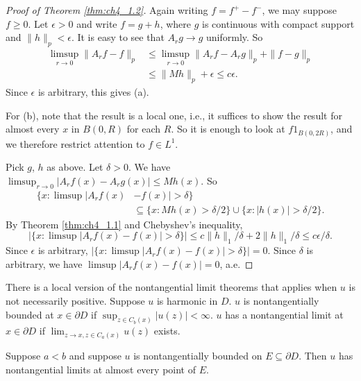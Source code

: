 \begin{proof}[Proof of Theorem \ref{thm:ch4_1.2}]
Again writing $f = f^+ - f^-$, we may suppose $f \geq 0$. Let $\epsilon > 0$ and write $f = g + h$, where $g$ is continuous with compact support and $\|h\|_p < \epsilon$. It is easy to see that $A_r g \to g$ uniformly. So
\begin{align*}
    \limsup_{r\to 0} \|A_r f - f\|_p &\leq \limsup_{r\to 0} \|A_r f - A_r g\|_p + \|f - g\|_p \\
    &\leq \|Mh\|_p + \epsilon \leq c\epsilon.
\end{align*}
Since $\epsilon$ is arbitrary, this gives (a).

For (b), note that the result is a local one, i.e., it suffices to show the result for almost every $x$ in $B(0,R)$ for each $R$. So it is enough to look at $f1_{B(0,2R)}$, and we therefore restrict attention to $f \in L^1$.

Pick $g$, $h$ as above. Let $\delta > 0$. We have $\limsup_{r\to 0} |A_r f(x) - A_r g(x)| \leq Mh(x)$. So
\begin{align*}
    \{x : \limsup |A_r f(x) &- f(x)| > \delta\} \\
    &\subseteq \{x : Mh(x) > \delta/2\} \cup \{x : |h(x)| > \delta/2\}.
\end{align*}
By Theorem \ref{thm:ch4_1.1} and Chebyshev's inequality,
\[
    |\{x : \limsup |A_r f(x) - f(x)| > \delta\}| \leq c\|h\|_1/\delta + 2\|h\|_1/\delta \leq c\epsilon/\delta.
\]
Since $\epsilon$ is arbitrary, $|\{x : \limsup |A_r f(x) - f(x)| > \delta\}| = 0$. Since $\delta$ is arbitrary, we have $\limsup |A_r f(x) - f(x)| = 0$, a.e.
\end{proof}


There is a local version of the nontangential limit theorems that applies when $u$ is not necessarily positive. Suppose $u$ is harmonic in $D$. $u$ is nontan\-gentially bounded at $x \in \partial D$ if $\sup_{z\in C_b(x)} |u(z)| < \infty$. $u$ has a nontangential limit at $x \in \partial D$ if $\lim_{z\to x,z\in C_a(x)} u(z)$ exists.

\begin{theorem}\label{thm:ch4_1.5}
Suppose $a < b$ and suppose $u$ is nontangentially bounded on $E \subseteq \partial D$. Then $u$ has nontangential limits at almost every point of $E$.
\end{theorem}

